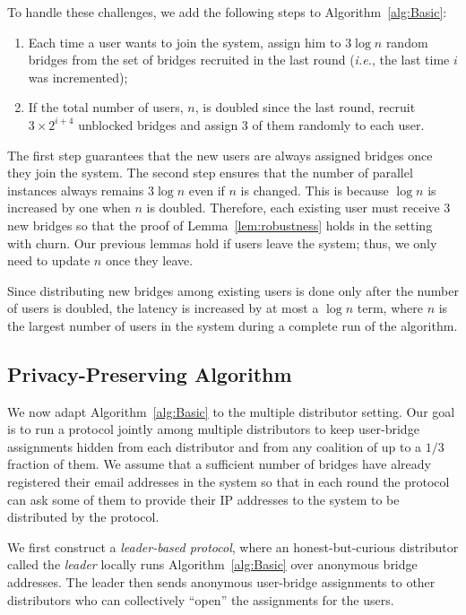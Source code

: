 \documentclass[USenglish,oneside,twocolumn]{article}
\newcommand{\ie}{\textit{i.e.}}
\begin{document}
\noindent To handle these challenges, we	 add the following steps to Algorithm~\ref{alg:Basic}:

\begin{enumerate}[itemsep=0.5em, topsep=0.6em]
	\item Each time a user wants to join the system, assign him to $3\log{n}$ random bridges from the set of bridges recruited in the last round (\ie, the last time $i$ was incremented);
	
	\item If the total number of users, $n$, is doubled since the last round, recruit $3 \times 2^{i+4}$ unblocked bridges and assign $3$ of them randomly to each user.
\end{enumerate}

The first step guarantees that the new users are always assigned bridges once they join the system. The second step ensures that the number of parallel instances always remains $3\log{n}$ even if $n$ is changed. This is because $\log{n}$ is increased by one when $n$ is doubled. Therefore, each existing user must receive $3$ new bridges so that the proof of Lemma~\ref{lem:robustness} holds in the setting with churn. Our previous lemmas hold if users leave the system; thus, we only need to update $n$ once they leave.

Since distributing new bridges among existing users is done only after the number of users is doubled, the latency is increased by at most a $\log{n}$ term, where $n$ is the largest number of users in the system during a complete run of the algorithm.

\subsection{Privacy-Preserving Algorithm} \label{sec:multi-dist}
We now adapt Algorithm~\ref{alg:Basic} to the multiple distributor setting. Our goal is to run a protocol jointly among multiple distributors to keep user-bridge assignments hidden from each distributor and from any coalition of up to a $1/3$ 	fraction of them. We assume that a sufficient number of bridges have already registered their email addresses in the system so that in each round the protocol can ask some of them to provide their IP addresses to the system to be distributed by the protocol.

We first construct a \emph{leader-based protocol}, where an honest-but-curious distributor called the \emph{leader} locally runs Algorithm~\ref{alg:Basic} over anonymous bridge addresses. The leader then sends anonymous user-bridge assignments to other distributors who can collectively ``open'' the assignments for the users. 
\end{document}
